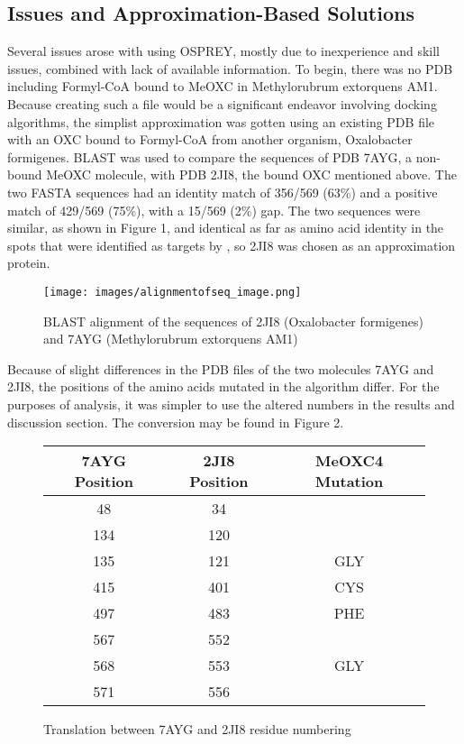 \documentclass[12pt]{extarticle}
\begin{document}
\subsection{Issues and Approximation-Based Solutions}
Several issues arose with using OSPREY, mostly due to inexperience and skill issues, combined with lack of available information. To begin, there was no PDB including Formyl-CoA bound to MeOXC in Methylorubrum extorquens AM1. Because creating such a file would be a significant endeavor involving docking algorithms, the simplist approximation was gotten using an existing PDB file with an OXC bound to Formyl-CoA from another organism, Oxalobacter formigenes. BLAST was used to compare the sequences of PDB 7AYG, a non-bound MeOXC molecule, with PDB 2JI8, the bound OXC mentioned above. The two FASTA sequences had an identity match of 356/569 (63\%) and a positive match of 429/569 (75\%), with a 15/569 (2\%) gap. 
The two sequences were similar, as shown in Figure 1, and identical as far as amino acid identity in the spots that were identified as targets by \cite{Nattermann}, so 2JI8 was chosen as an approximation protein.
\begin{figure}
    \centering
    \texttt{[image: images/alignmentofseq\_image.png]}
    \caption{BLAST alignment of the sequences of 2JI8 (Oxalobacter formigenes) and 7AYG (Methylorubrum extorquens AM1) }
    \label{fig:my_label}
\end{figure}
Because of slight differences in the PDB files of the two molecules 7AYG and 2JI8, the positions of the amino acids mutated in the algorithm differ. For the purposes of analysis, it was simpler to use the altered numbers in the results and discussion section. The conversion may be found in Figure 2.
\begin{figure}
\begin{center}
\begin{tabular}{||c c c||} 
 \hline
 7AYG Position & 2JI8 Position & MeOXC4 Mutation \\
 \hline\hline
 48 & 34 &\\ 
 \hline
 134 & 120 &\\
 \hline
 135 & 121 & GLY \\
 \hline
 415 & 401 & CYS \\
 \hline
 497 & 483 & PHE\\ 
 \hline
 567 & 552 & \\
 \hline
 568 & 553 & GLY\\ 
 \hline
 571 & 556 &\\  
 \hline
\end{tabular}
\end{center}
\caption{Translation between 7AYG and 2JI8 residue numbering}
\label{fig:my_label}
\end{figure}
\end{document}
